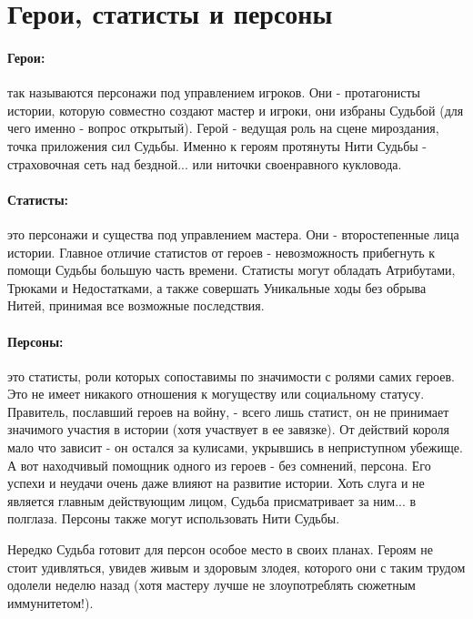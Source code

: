 \section{Герои, статисты и персоны}
\paragraph{Герои:} так называются персонажи под управлением игроков. Они - протагонисты истории, которую совместно создают мастер и игроки, они избраны Судьбой (для чего именно - вопрос открытый). Герой - ведущая роль на сцене мироздания, точка приложения сил Судьбы. Именно к героям протянуты Нити Судьбы - страховочная сеть над бездной... или ниточки своенравного кукловода.
\paragraph{Статисты:} это персонажи и существа под управлением мастера. Они - второстепенные лица истории. Главное отличие статистов от героев - невозможность прибегнуть к помощи Судьбы большую часть времени. Статисты могут обладать Атрибутами, Трюками и Недостатками, а также совершать Уникальные ходы без обрыва Нитей, принимая все возможные последствия.
\paragraph{Персоны:} это статисты, роли которых сопоставимы по значимости с ролями самих героев. Это не имеет никакого отношения к могуществу или социальному статусу. Правитель, пославший героев на войну, - всего лишь статист, он не принимает значимого участия в истории (хотя участвует в ее завязке). От действий короля мало что зависит - он остался за кулисами, укрывшись в неприступном убежище. А вот находчивый помощник одного из героев - без сомнений, персона. Его успехи и неудачи очень даже влияют на развитие истории. Хоть слуга и не является главным действующим лицом, Судьба присматривает за ним... в полглаза. Персоны также могут использовать Нити Судьбы.

\begin{tcolorbox}
    Нередко Судьба готовит для персон особое место в своих планах. Героям не стоит удивляться, увидев живым и здоровым злодея, которого они с таким трудом одолели неделю назад (хотя мастеру лучше не злоупотреблять сюжетным иммунитетом!).
\end{tcolorbox} 


